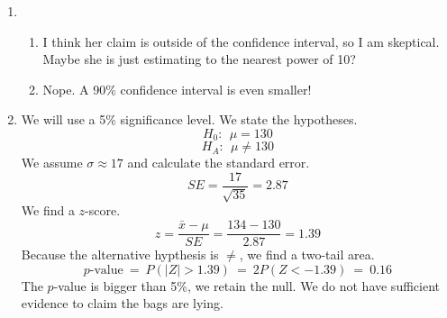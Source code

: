 \documentclass[12pt,letterpaper]{article}
\begin{document}
\begin{enumerate}
\item \begin{enumerate}
\item I think her claim is outside of the confidence interval, so I am skeptical. Maybe she is just estimating to the nearest power of 10? 
\item Nope. A 90\% confidence interval is even smaller! 
\end{enumerate}


\item We will use a 5\% significance level. We state the hypotheses.
$$H_0: ~~ \mu = 130 $$
$$H_A: ~~ \mu \ne 130  $$
We assume $\sigma \approx 17$ and calculate the standard error.
$$SE = \frac{17}{\sqrt{35}} = 2.87$$
We find a $z$-score.
$$z = \frac{\bar{x}-\mu}{SE} = \frac{134-130}{2.87} = 1.39 $$
Because the alternative hypthesis is $\ne$, we find a two-tail area.
$$p\text{-value} ~=~ P(|Z|>1.39) ~=~ 2P(Z<-1.39) ~=~ 0.16 $$
The $p$-value is bigger than 5\%, we retain the null. We do not have sufficient evidence to claim the bags are lying.

\end{enumerate}
\end{document}
